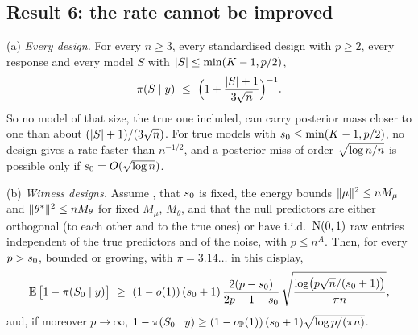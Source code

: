 \subsection{Result 6: the rate cannot be improved}\label{sec:sharp}


\begin{mainthm}\label{rem:sharp}
\textup{(a)} \emph{Every design.} For every $n\ge3$, every standardised design with $p\ge2$, every response and every
model $S$ with $\lvert S\rvert\le\min(K-1,p/2)$,
\begin{equation}\label{eq:sharp-a}
  \pi(S\mid y)\ \le\ \Big(1+\frac{\lvert S\rvert+1}{3\sqrt n}\Big)^{-1}.
\end{equation}
So no model of that size, the true one included, can carry posterior mass closer to one than about
$(\lvert S\rvert+1)/(3\sqrt n)$. For true models with $s_0\le\min(K-1,p/2)$, no design gives a rate faster than
$n^{-1/2}$, and a posterior miss of order $\sqrt{\log n/n}$ is possible only if $s_0=O(\sqrt{\log n})$.

\textup{(b)} \emph{Witness designs.} Assume , that $s_0$ is fixed, the energy bounds $\lVert \mu\rVert^2\le nM_\mu$ and
$\lVert \theta^*\rVert^2\le nM_\theta$ for fixed $M_\mu$, $M_\theta$, and that the null predictors are either orthogonal (to each
other and to the true ones) or have i.i.d.\ $\mathrm{N}(0,1)$ raw entries independent of the true predictors and of the
noise, with $p\le n^A$. Then, for every $p>s_0$, bounded or growing, with $\pi=3.14\ldots$ in this display,
\begin{equation}\label{eq:sharp-b}
  \E\big[1-\pis{\Sz}\big]\ \ge\ (1-o(1))\,(\sz+1)\,\frac{2(p-\sz)}{2p-1-\sz}\,
  \sqrt{\frac{\log\!\big(p\sqrt n/(\sz+1)\big)}{\pi n}},
\end{equation}
and, if moreover $p\to\infty$, $1-\pi(S_0\mid y)\ge(1-o_{\mathbb{P}}(1))\,(s_0+1)\sqrt{\log p/(\pi n)}$.
\end{mainthm}


